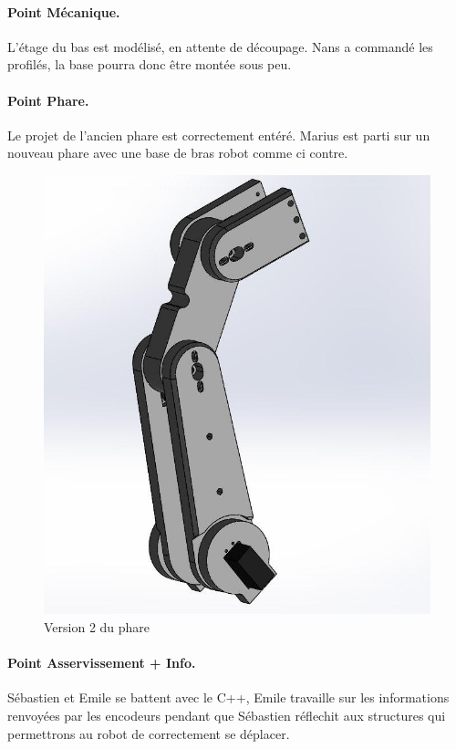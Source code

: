 \documentclass[a4paper,10pt]{report}
\begin{document}
\begin{spacing}{1.5}
\paragraph*{Point Mécanique.}
L'étage du bas est modélisé, en attente de découpage. Nans a commandé les
profilés, la base pourra donc être montée sous peu.

\paragraph*{Point Phare.}
Le projet de l'ancien phare est correctement entéré. Marius est parti sur un
nouveau phare avec une base de bras robot comme ci contre.
\begin{figure}[H]
  \center
  \includegraphics[scale=0.3]{phare.jpg}
  \caption{Version 2 du phare}
\end{figure}

\paragraph*{Point Asservissement + Info.}
Sébastien et Emile se battent avec le C++, Emile travaille sur les informations
renvoyées par les encodeurs pendant que Sébastien réflechit aux structures
qui permettrons au robot de correctement se déplacer.


\end{spacing}
\end{document}
